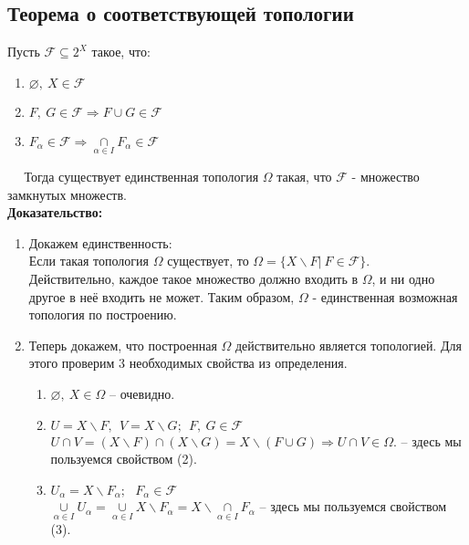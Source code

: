 \documentclass{article}
\begin{document}
\begin{spacing}{1.5}
\subsection{Теорема о соответствующей топологии}
  Пусть $ \mathcal{F} \subseteq 2^{X}$  такое, что:
\begin{enumerate}
\item $\varnothing ,~X\in \mathcal{F}$
\item $F,~G\in \mathcal{F} \Longrightarrow F\cup G\in \mathcal{F}$
\item $F_{\alpha}\in \mathcal{F} \Longrightarrow \underset{\alpha\in I}{\cap}F_{\alpha}\in \mathcal{F}$
\end{enumerate}
$~~~~~~$Тогда существует единственная топология $\Omega$ такая, что $\mathcal{F}$ - множество замкнутых множеств.
\\
\textbf{Доказательство:}
 \begin{enumerate}
\item Докажем единственность:\\
Если такая топология $\Omega$ существует, то $\Omega = \lbrace X\backslash F|~F\in \mathcal{F}\rbrace$.
\\ Действительно, каждое такое множество должно входить в $\Omega$, и ни одно другое в неё входить не может. Таким образом, $\Omega$ - единственная возможная топология по построению.
\item Теперь докажем, что построенная $\Omega$ действительно является топологией. Для этого проверим 3 необходимых свойства из определения.
\begin{enumerate}
\item $\varnothing,~X \in\Omega$ -- очевидно.
\item $U = X\backslash F,~~V=X\backslash G; ~~F,~G\in \mathcal{F}$
\\$U\cap V = (X\backslash F)\cap (X\backslash G)=X\backslash (F\cup G) \Longrightarrow U\cap V\in\Omega.$ -- здесь мы пользуемся свойством (2).
\item $U_{\alpha} = X\backslash F_{\alpha};~~~F_{\alpha}\in \mathcal{F}$
\\$\underset{\alpha\in I}{\cup}U_{\alpha} = \underset{\alpha\in I}{\cup}X\backslash F_{\alpha} = X\backslash\underset{\alpha\in I}{\cap}F_{\alpha}$ -- здесь мы пользуемся свойством (3).
\end{enumerate} 
\end{enumerate}
\newpage

\end{spacing}
\end{document}
